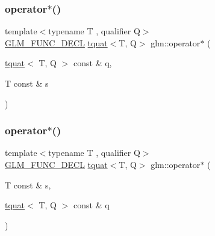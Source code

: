 \subsubsection{\texorpdfstring{operator$\ast$()}{operator*()}\hspace{0.1cm}{\footnotesize\ttfamily [6/7]}}
{\footnotesize\ttfamily template$<$typename T , qualifier Q$>$ \\
\mbox{\hyperlink{setup_8hpp_ab2d052de21a70539923e9bcbf6e83a51}{G\+L\+M\+\_\+\+F\+U\+N\+C\+\_\+\+D\+E\+CL}} \mbox{\hyperlink{structglm_1_1tquat}{tquat}}$<$T, Q$>$ glm\+::operator$\ast$ (\begin{DoxyParamCaption}\item[{\mbox{\hyperlink{structglm_1_1tquat}{tquat}}$<$ T, Q $>$ const \&}]{q,  }\item[{T const \&}]{s }\end{DoxyParamCaption})}

\mbox{\label{group__gtc__quaternion_ga4203f1da1798e6f6dd2549c6daec4e5a}} 
\subsubsection{\texorpdfstring{operator$\ast$()}{operator*()}\hspace{0.1cm}{\footnotesize\ttfamily [7/7]}}
{\footnotesize\ttfamily template$<$typename T , qualifier Q$>$ \\
\mbox{\hyperlink{setup_8hpp_ab2d052de21a70539923e9bcbf6e83a51}{G\+L\+M\+\_\+\+F\+U\+N\+C\+\_\+\+D\+E\+CL}} \mbox{\hyperlink{structglm_1_1tquat}{tquat}}$<$T, Q$>$ glm\+::operator$\ast$ (\begin{DoxyParamCaption}\item[{T const \&}]{s,  }\item[{\mbox{\hyperlink{structglm_1_1tquat}{tquat}}$<$ T, Q $>$ const \&}]{q }\end{DoxyParamCaption})}

\mbox{\label{group__gtc__quaternion_ga415c33d49346428f93089f80cf8f9187}} 
